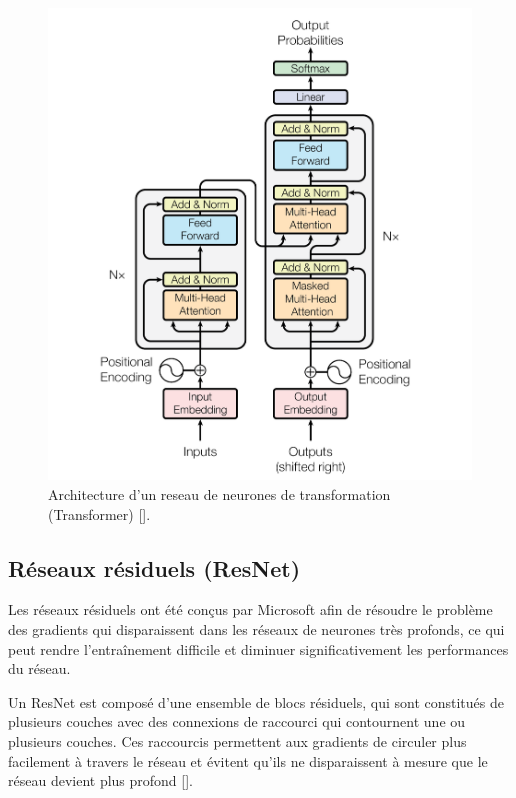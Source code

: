 \begin{figure}[hbt!]
	\centering
	\includegraphics[width=12cm]{images_pfe/transformer-architecture.png}
	\caption{Architecture d'un reseau de neurones de transformation (Transformer) [\cite{attention_is_all_you_need}].}
	\label{fig:gan}
\end{figure}
\FloatBarrier

\subsection{Réseaux résiduels (ResNet)}
Les réseaux résiduels ont été conçus par Microsoft afin de résoudre le problème
des gradients qui disparaissent dans les réseaux de neurones très profonds, ce
qui peut rendre l'entraînement difficile et diminuer significativement les
performances du réseau.

\medskip
Un ResNet est composé d'une ensemble de blocs résiduels, qui sont constitués de plusieurs couches avec des connexions de raccourci qui contournent une ou plusieurs couches. Ces raccourcis permettent aux gradients de circuler plus facilement à travers le réseau et évitent qu'ils ne disparaissent à mesure que le réseau devient plus profond [\cite{He_2016_CVPR}].

